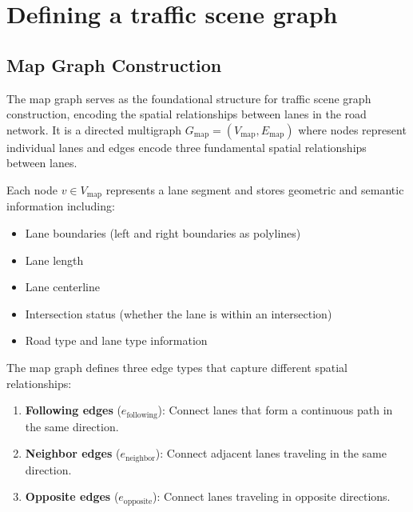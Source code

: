 \section{Defining a traffic scene graph}
\label{chapter:defining_a_traffic_scene_graph}






\subsection{Map Graph Construction}
\label{subsec:map_graph}

The map graph serves as the foundational structure for traffic scene graph construction, encoding the 
spatial relationships between lanes in the road network. It is a directed multigraph 
$G_{\text{map}} = (V_{\text{map}}, E_{\text{map}})$ where nodes represent individual lanes and edges 
encode three fundamental spatial relationships between lanes.

Each node $v \in V_{\text{map}}$ represents a lane segment and stores geometric and semantic 
information including:
\begin{itemize}
    \item Lane boundaries (left and right boundaries as polylines)
    \item Lane length
    \item Lane centerline
    \item Intersection status (whether the lane is within an intersection)
    \item Road type and lane type information
\end{itemize}

The map graph defines three edge types that capture different spatial relationships:

\begin{enumerate}
    \item \textbf{Following edges} ($e_{\text{following}}$): Connect lanes that form a continuous 
          path in the same direction. 
    
    \item \textbf{Neighbor edges} ($e_{\text{neighbor}}$): Connect adjacent lanes traveling in 
          the same direction. 
    
    \item \textbf{Opposite edges} ($e_{\text{opposite}}$): Connect lanes traveling in opposite 
          directions. 
\end{enumerate}

